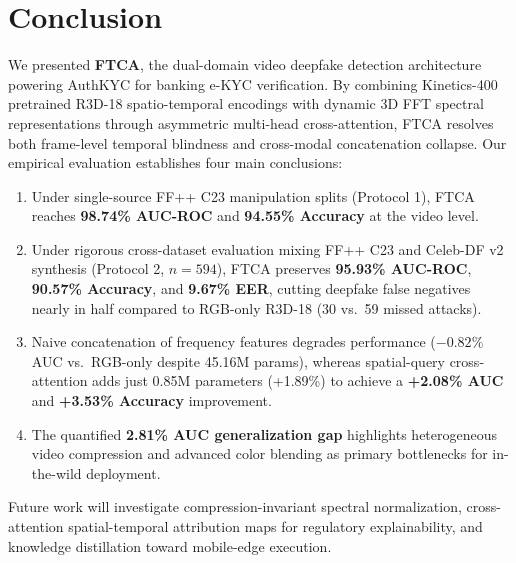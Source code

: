 \documentclass[conference,10pt]{IEEEtran}
\begin{document}
\section{Conclusion}

We presented \textbf{FTCA}, the dual-domain video deepfake detection architecture powering AuthKYC for banking e-KYC verification. By combining Kinetics-400 pretrained R3D-18 spatio-temporal encodings with dynamic 3D FFT spectral representations through asymmetric multi-head cross-attention, FTCA resolves both frame-level temporal blindness and cross-modal concatenation collapse. Our empirical evaluation establishes four main conclusions:
\begin{enumerate}[leftmargin=*]
    \item Under single-source FF++ C23 manipulation splits (Protocol 1), FTCA reaches \textbf{98.74\% AUC-ROC} and \textbf{94.55\% Accuracy} at the video level.
    \item Under rigorous cross-dataset evaluation mixing FF++ C23 and Celeb-DF v2 synthesis (Protocol 2, $n=594$), FTCA preserves \textbf{95.93\% AUC-ROC}, \textbf{90.57\% Accuracy}, and \textbf{9.67\% EER}, cutting deepfake false negatives nearly in half compared to RGB-only R3D-18 (30 vs.\ 59 missed attacks).
    \item Naive concatenation of frequency features degrades performance ($-0.82\%$ AUC vs.\ RGB-only despite 45.16M params), whereas spatial-query cross-attention adds just 0.85M parameters (+1.89\%) to achieve a \textbf{+2.08\% AUC} and \textbf{+3.53\% Accuracy} improvement.
    \item The quantified \textbf{2.81\% AUC generalization gap} highlights heterogeneous video compression and advanced color blending as primary bottlenecks for in-the-wild deployment.
\end{enumerate}

Future work will investigate compression-invariant spectral normalization, cross-attention spatial-temporal attribution maps for regulatory explainability, and knowledge distillation toward mobile-edge execution.
\end{document}
